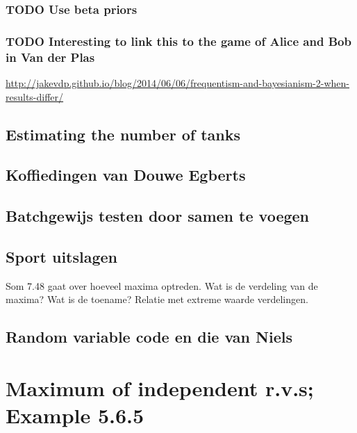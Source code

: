 \documentclass[a4paper]{article}
\begin{document}
\subsubsection{{\bfseries\sffamily TODO} Use beta priors}
\label{sec:org9297a86}
\subsubsection{{\bfseries\sffamily TODO} Interesting to link this to the game of Alice and Bob in Van der Plas}
\label{sec:orgafbfbd0}
\url{http://jakevdp.github.io/blog/2014/06/06/frequentism-and-bayesianism-2-when-results-differ/}

\subsection{Estimating the number of tanks}
\label{sec:org0700c8f}


\subsection{Koffiedingen van Douwe Egberts}
\label{sec:orgbe91c90}

\subsection{Batchgewijs testen door samen te voegen}
\label{sec:org7f21ad2}



\subsection{Sport uitslagen}
\label{sec:org9a46c5b}

Som 7.48 gaat over hoeveel maxima optreden. Wat is de verdeling van de maxima? Wat is de toename? Relatie met extreme waarde verdelingen. 

\subsection{Random variable code en die van Niels}
\label{sec:org57ced54}

\section{Maximum of independent r.v.s; Example 5.6.5}
\label{sec:orgb2a351d}
\end{document}

